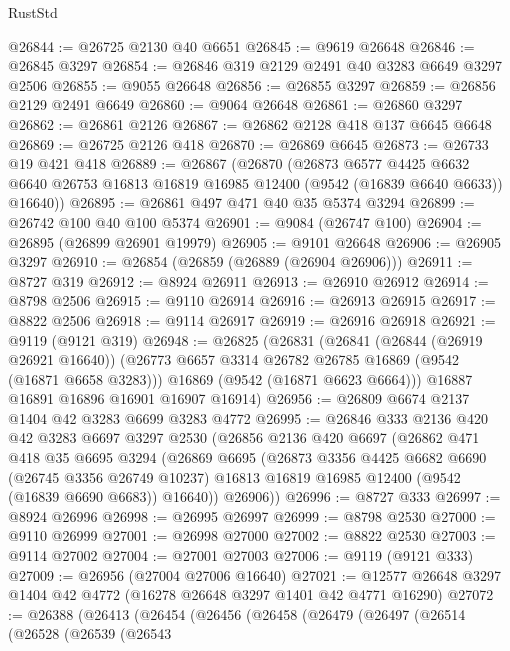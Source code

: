 \begin{lexlean}{RustStd}
\begin{coremodule}
@26844 := @26725 @2130 @40 @6651
@26845 := @9619 @26648
@26846 := @26845 @3297
@26854 := @26846 @319 @2129 @2491 @40 @3283 @6649 @3297 @2506
@26855 := @9055 @26648
@26856 := @26855 @3297
@26859 := @26856 @2129 @2491 @6649
@26860 := @9064 @26648
@26861 := @26860 @3297
@26862 := @26861 @2126
@26867 := @26862 @2128 @418 @137 @6645 @6648
@26869 := @26725 @2126 @418
@26870 := @26869 @6645
@26873 := @26733 @19 @421 @418
@26889 := @26867
    (@26870
      (@26873
        @6577
        @4425
        @6632
        @6640
        @26753
        @16813
        @16819
        @16985
        @12400
        (@9542 (@16839 @6640 @6633))
        @16640))
@26895 := @26861 @497 @471 @40 @35 @5374 @3294
@26899 := @26742 @100 @40 @100 @5374
@26901 := @9084 (@26747 @100)
@26904 := @26895 (@26899 @26901 @19979)
@26905 := @9101 @26648
@26906 := @26905 @3297
@26910 := @26854 (@26859 (@26889 (@26904 @26906)))
@26911 := @8727 @319
@26912 := @8924 @26911
@26913 := @26910 @26912
@26914 := @8798 @2506
@26915 := @9110 @26914
@26916 := @26913 @26915
@26917 := @8822 @2506
@26918 := @9114 @26917
@26919 := @26916 @26918
@26921 := @9119 (@9121 @319)
@26948 := @26825
    (@26831
      (@26841
        (@26844 (@26919 @26921 @16640))
        (@26773 @6657 @3314 @26782 @26785 @16869 (@9542 (@16871 @6658 @3283)))
        @16869
        (@9542 (@16871 @6623 @6664)))
      @16887
      @16891
      @16896
      @16901
      @16907
      @16914)
@26956 := @26809 @6674 @2137 @1404 @42 @3283 @6699 @3283 @4772
@26995 := @26846
    @333
    @2136
    @420
    @42
    @3283
    @6697
    @3297
    @2530
    (@26856
      @2136
      @420
      @6697
      (@26862
        @471
        @418
        @35
        @6695
        @3294
        (@26869
          @6695
          (@26873
            @3356
            @4425
            @6682
            @6690
            (@26745 @3356 @26749 @10237)
            @16813
            @16819
            @16985
            @12400
            (@9542 (@16839 @6690 @6683))
            @16640))
        @26906))
@26996 := @8727 @333
@26997 := @8924 @26996
@26998 := @26995 @26997
@26999 := @8798 @2530
@27000 := @9110 @26999
@27001 := @26998 @27000
@27002 := @8822 @2530
@27003 := @9114 @27002
@27004 := @27001 @27003
@27006 := @9119 (@9121 @333)
@27009 := @26956 (@27004 @27006 @16640)
@27021 := @12577 @26648 @3297 @1404 @42 @4772 (@16278 @26648 @3297 @1401 @42 @4771 @16290)
@27072 := @26388
    (@26413
      (@26454
        (@26456
          (@26458
            (@26479
              (@26497
                (@26514
                  (@26528
                    (@26539
                      (@26543

\end{coremodule}
\end{lexlean}
